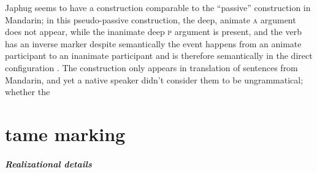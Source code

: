 \documentclass[a4paper, oneside, 12pt]{report}
\newcommand*{\citepage}[1]{p.~{#1}}
\newcommand{\category}[1]{\textsc{#1}}
\begin{document}
Japhug seems to have a construction comparable to
the ``passive'' construction in Mandarin;
in this pseudo-passive construction,
the deep, animate \category{a} argument does not appear, 
while the inanimate deep \category{p} argument is present, 
and the verb has an inverse marker 
despite semantically the event happens 
from an animate participant to an inanimate participant
and is therefore semantically in the direct configuration
\citep[\citepage{575}]{jacques2021grammar}.
The construction only appears in translation of sentences from Mandarin,
and yet a native speaker didn't consider them to be ungrammatical;
whether the 

\chapter{\acs{tame} marking}


\paragraph*{Realizational details}
\end{document}

